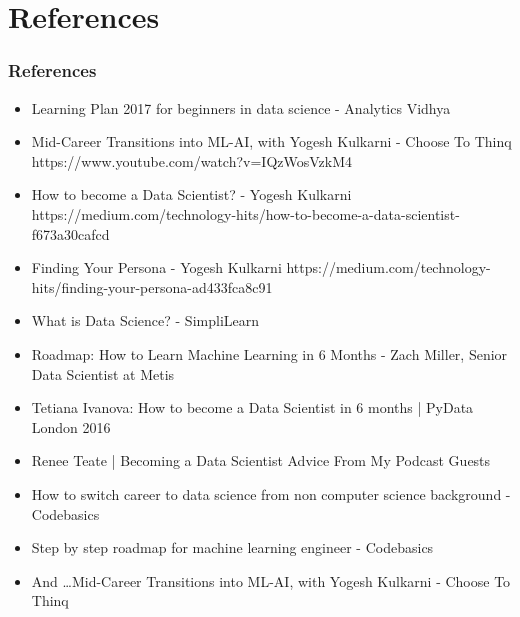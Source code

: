 \section[Refs]{References}

\begin{frame}[fragile]\frametitle{References}
\begin{itemize}
\item Learning Plan 2017 for beginners in data science - Analytics Vidhya
\item Mid-Career Transitions into ML-AI, with Yogesh Kulkarni - Choose To Thinq https://www.youtube.com/watch?v=IQzWosVzkM4
\item How to become a Data Scientist? - Yogesh Kulkarni https://medium.com/technology-hits/how-to-become-a-data-scientist-f673a30cafcd
\item Finding Your Persona - Yogesh Kulkarni https://medium.com/technology-hits/finding-your-persona-ad433fca8c91
\item What is Data Science? - SimpliLearn
\item Roadmap: How to Learn Machine Learning in 6 Months -  Zach Miller, Senior Data Scientist at Metis
\item Tetiana Ivanova: How to become a Data Scientist in 6 months | PyData London 2016
\item Renee Teate | Becoming a Data Scientist Advice From My Podcast Guests
\item How to switch career to data science from non computer science background - Codebasics
\item Step by step roadmap for machine learning engineer - Codebasics
\item And \ldots Mid-Career Transitions into ML-AI, with Yogesh Kulkarni - Choose To Thinq
\end{itemize}
\end{frame}

